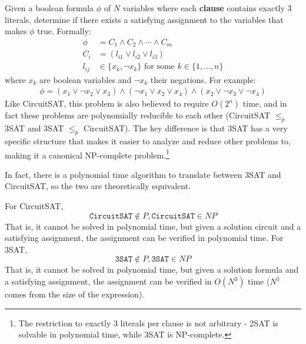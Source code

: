   \begin{definition}[3SAT]
    Given a boolean formula $\phi$ of $N$ variables where each \textbf{clause} contains exactly 3 literals, determine if there exists a satisfying assignment to the variables that makes $\phi$ true. Formally:
    \begin{align*}
      \phi &= C_1 \land C_2 \land \cdots \land C_m \\
      C_i &= (l_{i1} \lor l_{i2} \lor l_{i3}) \\
      l_{ij} &\in \{x_k, \neg x_k\} \text{ for some } k \in \{1,\ldots,n\}
    \end{align*}
    where $x_k$ are boolean variables and $\neg x_k$ their negations. For example:
    \begin{align*}
      \phi = (x_1 \lor \neg x_2 \lor x_3) \land (\neg x_1 \lor x_2 \lor x_4) \land (x_2 \lor \neg x_3 \lor \neg x_4)
    \end{align*}
    Like CircuitSAT, this problem is also believed to require $O(2^n)$ time, and in fact these problems are polynomially reducible to each other (CircuitSAT $\leq_p$ 3SAT and 3SAT $\leq_p$ CircuitSAT). The key difference is that 3SAT has a very specific structure that makes it easier to analyze and reduce other problems to, making it a canonical NP-complete problem.\footnote{The restriction to exactly 3 literals per clause is not arbitrary - 2SAT is solvable in polynomial time, while 3SAT is NP-complete.}
  \end{definition}

  In fact, there is a polynomial time algorithm to translate between 3SAT and CircuitSAT, so the two are theoretically equivalent. 

  \begin{theorem}
    For CircuitSAT, 
    \begin{equation}
      \texttt{CircuitSAT} \not\in P, \texttt{CircuitSAT} \in NP
    \end{equation}
    That is, it cannot be solved in polynomial time, but given a solution circuit and a satisfying assignment, the assignment can be verified in polynomial time. 
    For 3SAT, 
    \begin{equation}
      \texttt{3SAT} \not\in P, \texttt{3SAT} \in NP
    \end{equation}
    That is, it cannot be solved in polynomial time, but given a solution formula and a satisfying assignment, the assignment can be verified in $O(N^3)$ time ($N^3$ comes from the size of the expression). 
  \end{theorem}

